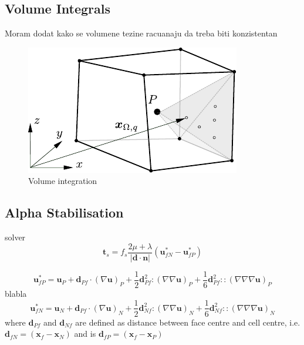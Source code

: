 \documentclass[sn-mathphys,Numbered]{sn-jnl}%
\newcommand{\bb}{\boldsymbol}
\begin{document}
\subsection{Volume Integrals}
\label{sec:vol_int}
%
Moram dodat kako se volumene tezine racuanaju da treba biti konzistentan
\begin{figure}[H]
 	\centering
    \includegraphics[scale=0.8]{figures/volumeTerm} 
 	\caption{Volume integration}
 	\label{fig:volumeTerm}
\end{figure}



%
\subsection{Alpha Stabilisation}
\label{sec:vol_int}
%
solver
\begin{equation}
\bb{t}_s = f_s \frac{2\mu +\lambda}{|\bb{d} \cdot \bb{n}|}(\bb{u}_{fN}^*-\bb{u}_{fP}^*)
\end{equation}

\begin{equation}
\bb{u}_{fP}^* = \bb{u}_P + \bb{d}_{Pf} \cdot (\nabla \bb{u})_P + \frac{1}{2}\bb{d}_{Pf}^2 \!:\! (\nabla \nabla \bb{u})_P + \frac{1}{6}\bb{d}_{Pf}^2 \!::\! (\nabla \nabla \nabla \bb{u})_P
\end{equation}
blabla
\begin{equation}
\bb{u}_{fN}^* = \bb{u}_N + \bb{d}_{Pf} \cdot (\nabla \bb{u})_N + \frac{1}{2}\bb{d}_{Nf}^2 \!:\! (\nabla \nabla \bb{u})_N + \frac{1}{6}\bb{d}_{Nf}^2 \!::\! (\nabla \nabla \nabla \bb{u})_N
\end{equation}
where $\bb{d}_{Pf}$ and $\bb{d}_{Nf}$  are defined as distance between face centre and cell centre, i.e. $\bb{d}_{fN}=(\bb{x}_f-\bb{x}_N)$ and is $\bb{d}_{fP}=(\bb{x}_f-\bb{x}_P)$ 
\end{document}

